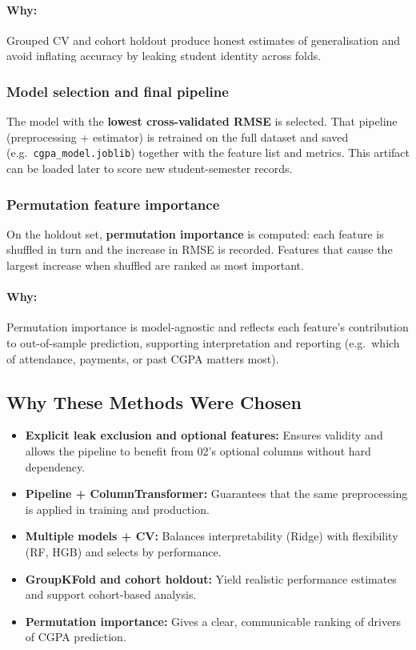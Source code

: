 \documentclass[12pt,a4paper]{article}
\begin{document}
\paragraph{Why:} Grouped CV and cohort holdout produce honest estimates of generalisation and avoid inflating accuracy by leaking student identity across folds.

\subsubsection{Model selection and final pipeline}

The model with the \textbf{lowest cross-validated RMSE} is selected. That pipeline (preprocessing + estimator) is retrained on the full dataset and saved (e.g.\ \texttt{cgpa\_model.joblib}) together with the feature list and metrics. This artifact can be loaded later to score new student-semester records.

\subsubsection{Permutation feature importance}

On the holdout set, \textbf{permutation importance} is computed: each feature is shuffled in turn and the increase in RMSE is recorded. Features that cause the largest increase when shuffled are ranked as most important.

\paragraph{Why:} Permutation importance is model-agnostic and reflects each feature’s contribution to out-of-sample prediction, supporting interpretation and reporting (e.g.\ which of attendance, payments, or past CGPA matters most).

\subsection{Why These Methods Were Chosen}

\begin{itemize}[leftmargin=*]
  \item \textbf{Explicit leak exclusion and optional features:} Ensures validity and allows the pipeline to benefit from 02’s optional columns without hard dependency.
  \item \textbf{Pipeline + ColumnTransformer:} Guarantees that the same preprocessing is applied in training and production.
  \item \textbf{Multiple models + CV:} Balances interpretability (Ridge) with flexibility (RF, HGB) and selects by performance.
  \item \textbf{GroupKFold and cohort holdout:} Yield realistic performance estimates and support cohort-based analysis.
  \item \textbf{Permutation importance:} Gives a clear, communicable ranking of drivers of CGPA prediction.
\end{itemize}
\end{document}

